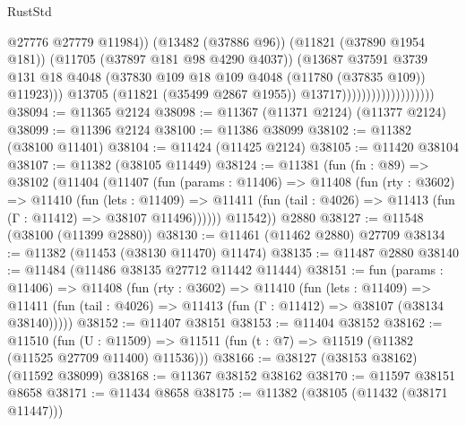 \begin{lexlean}{RustStd}
\begin{coremodule}
                                                @27776
                                                @27779
                                                @11984))
                                            (@13482 (@37886 @96))
                                            (@11821 (@37890 @1954 @181))
                                            (@11705 (@37897 @181 @98 @4290 @4037))
                                            (@13687
                                              @37591
                                              @3739
                                              @131
                                              @18
                                              @4048
                                              (@37830
                                                @109
                                                @18
                                                @109
                                                @4048
                                                (@11780 (@37835 @109))
                                                @11923)))
                                          @13705
                                          (@11821 (@35499 @2867 @1955))
                                          @13717)))))))))))))))))))
@38094 := @11365 @2124
@38098 := @11367 (@11371 @2124) (@11377 @2124)
@38099 := @11396 @2124
@38100 := @11386 @38099
@38102 := @11382 (@38100 @11401)
@38104 := @11424 (@11425 @2124)
@38105 := @11420 @38104
@38107 := @11382 (@38105 @11449)
@38124 := @11381
    (fun (fn : @89) =>
    @38102
      (@11404
        (@11407
          (fun (params : @11406) =>
          @11408
            (fun (rty : @3602) =>
            @11410
              (fun (lets : @11409) =>
              @11411 (fun (tail : @4026) => @11413 (fun (Γ : @11412) => @38107 @11496))))))
        @11542))
    @2880
@38127 := @11548 (@38100 (@11399 @2880))
@38130 := @11461 (@11462 @2880) @27709
@38134 := @11382 (@11453 (@38130 @11470) @11474)
@38135 := @11487 @2880
@38140 := @11484 (@11486 @38135 @27712 @11442 @11444)
@38151 := fun (params : @11406) =>
  @11408
    (fun (rty : @3602) =>
    @11410
      (fun (lets : @11409) =>
      @11411 (fun (tail : @4026) => @11413 (fun (Γ : @11412) => @38107 (@38134 @38140)))))
@38152 := @11407 @38151
@38153 := @11404 @38152
@38162 := @11510
    (fun (U : @11509) => @11511 (fun (t : @7) => @11519 (@11382 (@11525 @27709 @11400) @11536)))
@38166 := @38127 (@38153 @38162) (@11592 @38099)
@38168 := @11367 @38152 @38162
@38170 := @11597 @38151 @8658
@38171 := @11434 @8658
@38175 := @11382 (@38105 (@11432 (@38171 @11447)))

\end{coremodule}
\end{lexlean}

